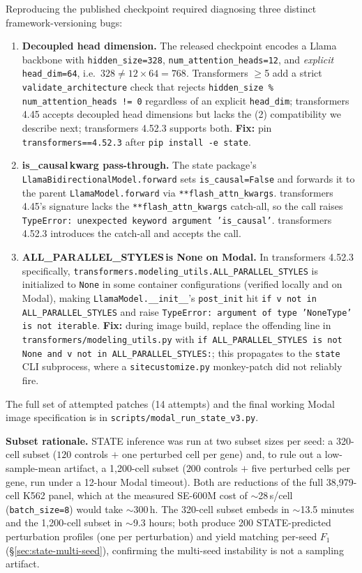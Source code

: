 \documentclass{article}
\theoremstyle{plain}
\theoremstyle{definition}
\theoremstyle{remark}
\begin{document}
Reproducing the published checkpoint required diagnosing three distinct framework-versioning bugs:
\begin{enumerate}[leftmargin=1.5em,topsep=2pt,itemsep=2pt]
    \item \textbf{Decoupled head dimension.} The released checkpoint encodes a Llama backbone with \texttt{hidden\_size=328}, \texttt{num\_attention\_heads=12}, and \emph{explicit} \texttt{head\_dim=64}, i.e.\ $328 \neq 12 \times 64 = 768$. Transformers $\geq$5 add a strict \texttt{validate\_architecture} check that rejects \texttt{hidden\_size \% num\_attention\_heads != 0} regardless of an explicit \texttt{head\_dim}; transformers 4.45 accepts decoupled head dimensions but lacks the (2) compatibility we describe next; transformers 4.52.3 supports both. \textbf{Fix:} pin \texttt{transformers==4.52.3} after \texttt{pip install -e state}.
    \item \textbf{is\_causal\,kwarg pass-through.} The state package's \texttt{LlamaBidirectionalModel.forward} sets \texttt{is\_causal=False} and forwards it to the parent \texttt{LlamaModel.forward} via \texttt{**flash\_attn\_kwargs}. transformers 4.45's signature lacks the \texttt{**flash\_attn\_kwargs} catch-all, so the call raises \texttt{TypeError: unexpected keyword argument 'is\_causal'}. transformers 4.52.3 introduces the catch-all and accepts the call.
    \item \textbf{ALL\_PARALLEL\_STYLES\,is None on Modal.} In transformers 4.52.3 specifically, \texttt{transformers.modeling\_utils.ALL\_PARALLEL\_STYLES} is initialized to \texttt{None} in some container configurations (verified locally and on Modal), making \texttt{LlamaModel.\_\_init\_\_}'s \texttt{post\_init} hit \texttt{if v not in ALL\_PARALLEL\_STYLES} and raise \texttt{TypeError: argument of type 'NoneType' is not iterable}. \textbf{Fix:} during image build, replace the offending line in \texttt{transformers/modeling\_utils.py} with \texttt{if ALL\_PARALLEL\_STYLES is not None and v not in ALL\_PARALLEL\_STYLES:}; this propagates to the \texttt{state} CLI subprocess, where a \texttt{sitecustomize.py} monkey-patch did not reliably fire.
\end{enumerate}

The full set of attempted patches (14 attempts) and the final working Modal image specification is in \texttt{scripts/modal\_run\_state\_v3.py}.

\textbf{Subset rationale.} STATE inference was run at two subset sizes per seed: a 320-cell subset ($120$ controls $+$ one perturbed cell per gene) and, to rule out a low-sample-mean artifact, a 1{,}200-cell subset ($200$ controls $+$ five perturbed cells per gene, run under a 12-hour Modal timeout). Both are reductions of the full 38{,}979-cell K562 panel, which at the measured SE-600M cost of $\sim$28\,s/cell (\texttt{batch\_size=8}) would take $\sim$300\,h. The 320-cell subset embeds in $\sim$13.5 minutes and the 1{,}200-cell subset in $\sim$9.3 hours; both produce 200 STATE-predicted perturbation profiles (one per perturbation) and yield matching per-seed $F_1$ (\S\ref{sec:state-multi-seed}), confirming the multi-seed instability is not a sampling artifact.
\end{document}
